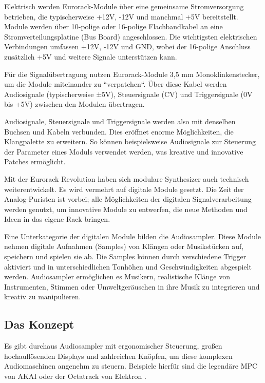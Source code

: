 	Elektrisch werden Eurorack-Module über eine gemeinsame Stromversorgung betrieben, die typischerweise +12V, -12V und manchmal +5V bereitstellt. Module werden über 10-polige oder 16-polige Flachbandkabel an eine Stromverteilungsplatine (Bus Board) angeschlossen. Die wichtigsten elektrischen Verbindungen umfassen +12V, -12V und GND, wobei der 16-polige Anschluss zusätzlich +5V und weitere Signale unterstützen kann. \cite{eurorack-standard}
	
	Für die Signalübertragung nutzen Eurorack-Module 3,5 mm Monoklinkenstecker, um die Module miteinander zu ``verpatchen``. Über diese Kabel werden Audiosignale (typischerweise ±5V), Steuersignale (CV) und Triggersignale (0V bis +5V) zwischen den Modulen übertragen.
	
	Audiosignale, Steuersignale und Triggersignale werden also mit denselben Buchsen und Kabeln verbunden.
	Dies eröffnet enorme Möglichkeiten, die Klangpalette zu erweitern. So können beispielsweise Audiosignale zur Steuerung der Parameter eines Moduls verwendet werden, was kreative und innovative Patches ermöglicht.
	
	Mit der Eurorack Revolution haben sich modulare Synthesizer auch technisch weiterentwickelt. 
	Es wird vermehrt auf digitale Module gesetzt. 
	Die Zeit der Analog-Puristen ist vorbei; alle Möglichkeiten der digitalen Signalverarbeitung werden genutzt, um innovative Module zu entwerfen, die neue Methoden und Ideen in das eigene Rack bringen.
	
	Eine Unterkategorie der digitalen Module bilden die Audiosampler. Diese Module nehmen digitale Aufnahmen (Samples) von Klängen oder Musikstücken auf, speichern und spielen sie ab. Die Samples können durch verschiedene Trigger aktiviert und in unterschiedlichen Tonhöhen und Geschwindigkeiten abgespielt werden. 
	Audiosampler ermöglichen es Musikern, realistische Klänge von Instrumenten, Stimmen oder Umweltgeräuschen in ihre Musik zu integrieren und kreativ zu manipulieren.
	
	\subsection{Das Konzept}
	
	Es gibt durchaus Audiosampler mit ergonomischer Steuerung, großen hochauflösenden Displays und zahlreichen Knöpfen, um diese komplexen Audiomaschinen angenehm zu steuern. 
	Beispiele hierfür sind die legendäre MPC von AKAI \cite{akai-mpc} oder der Octatrack von Elektron \cite{elektron-octatrack}. 
	
